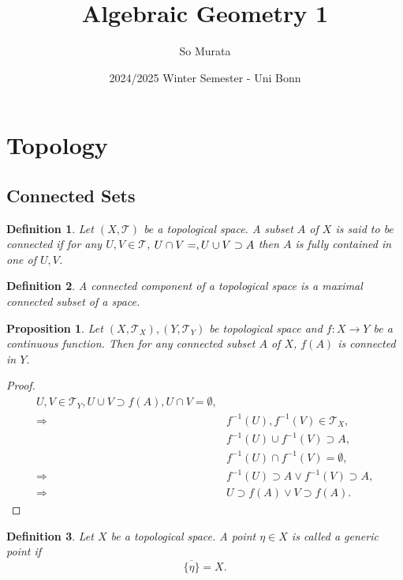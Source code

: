 \documentclass{article}
\title{Algebraic Geometry 1}
\author{So Murata}
\date{2024/2025 Winter Semester - Uni Bonn}
\newtheorem{proposition}{Proposition}[section]
\newtheorem{definition}{Definition}[section]
\numberwithin{equation}{section}
\begin{document}
\maketitle

\section{Topology}

\subsection{Connected Sets}

\begin{definition}
Let $(X,\mathcal{T})$ be a topological space. A subset $A$ of $X$ is said to be connected if for any $U,V\in\mathcal{T}$, $U\cap V=\empty, U\cup V\supset A$ then $A$ is fully contained in one of $U,V$. 
\end{definition}

\begin{definition}
A connected component of a topological space is a maximal connected subset of a space. 
\end{definition}

\begin{proposition}
Let $(X,\mathcal{T}_X),(Y,\mathcal{T}_Y)$ be topological space and $f:X\to Y$ be a continuous function. Then for any connected subset $A$ of $X$, $f(A)$ is connected in $Y$. 
\end{proposition}

\begin{proof}
\begin{align*}
U,V\in\mathcal{T}_Y, U\cup V\supset f(A), U\cap V=\emptyset, \\
 \Rightarrow &f^{-1}(U),f^{-1}(V)\in\mathcal{T}_X,\\
& f^{-1}(U)\cup f^{-1}(V)\supset A, \\
&f^{-1}(U)\cap f^{-1}(V)=\emptyset,\\
 \Rightarrow& f^{-1}(U)\supset A\lor f^{-1}(V)\supset A,\\
 \Rightarrow& U\supset f(A) \lor V\supset f(A).
\end{align*}
\end{proof}

\begin{definition}
Let $X$ be a topological space. A point $\eta\in X$ is called a generic point if 
\begin{equation*}
\overline{\{\eta\}} = X.
\end{equation*}
\end{definition}
\end{document}

